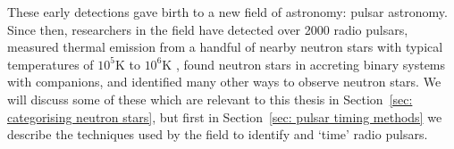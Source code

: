 These early detections gave birth to a new field of astronomy: pulsar astronomy.
Since then, researchers in the field have detected over 2000 radio pulsars, measured thermal
emission from a handful of nearby neutron stars with typical temperatures of
$10^{5}$K to $10^{6}$K \citep{pavlov2003thermal}, found neutron stars in
accreting binary systems with companions, and identified many other ways to
observe neutron stars. We will discuss some of these which are relevant to this
thesis in Section~\ref{sec: categorising neutron stars}, but first in
Section~\ref{sec: pulsar timing methods} we describe the techniques used by the
field to identify and `time' radio pulsars.
